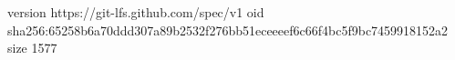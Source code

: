 version https://git-lfs.github.com/spec/v1
oid sha256:65258b6a70ddd307a89b2532f276bb51eceeeef6c66f4bc5f9bc7459918152a2
size 1577

